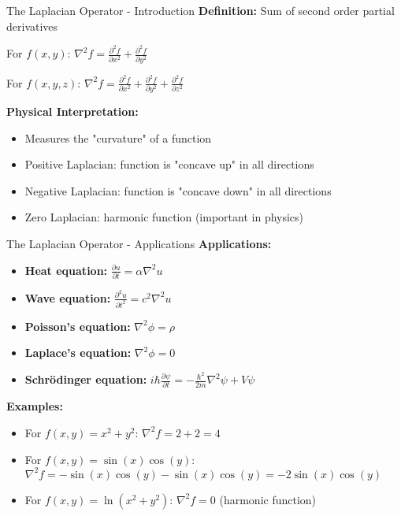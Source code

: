 \documentclass[aspectratio=169]{beamer}
\begin{document}
\begin{frame}{The Laplacian Operator - Introduction}
\textbf{Definition:} Sum of second order partial derivatives

For $f(x,y)$: $\nabla^2 f = \frac{\partial^2 f}{\partial x^2} + \frac{\partial^2 f}{\partial y^2}$

For $f(x,y,z)$: $\nabla^2 f = \frac{\partial^2 f}{\partial x^2} + \frac{\partial^2 f}{\partial y^2} + \frac{\partial^2 f}{\partial z^2}$

\textbf{Physical Interpretation:}
\begin{itemize}
    \item Measures the "curvature" of a function
    \item Positive Laplacian: function is "concave up" in all directions
    \item Negative Laplacian: function is "concave down" in all directions
    \item Zero Laplacian: harmonic function (important in physics)
\end{itemize}
\end{frame}

\begin{frame}{The Laplacian Operator - Applications}
\textbf{Applications:}
\begin{itemize}
    \item \textbf{Heat equation:} $\frac{\partial u}{\partial t} = \alpha \nabla^2 u$
    \item \textbf{Wave equation:} $\frac{\partial^2 u}{\partial t^2} = c^2 \nabla^2 u$
    \item \textbf{Poisson's equation:} $\nabla^2 \phi = \rho$
    \item \textbf{Laplace's equation:} $\nabla^2 \phi = 0$
    \item \textbf{Schrödinger equation:} $i\hbar\frac{\partial \psi}{\partial t} = -\frac{\hbar^2}{2m}\nabla^2 \psi + V\psi$
\end{itemize}

\textbf{Examples:}
\begin{itemize}
    \item For $f(x,y) = x^2 + y^2$: $\nabla^2 f = 2 + 2 = 4$
    \item For $f(x,y) = \sin(x)\cos(y)$: $\nabla^2 f = -\sin(x)\cos(y) - \sin(x)\cos(y) = -2\sin(x)\cos(y)$
    \item For $f(x,y) = \ln(x^2 + y^2)$: $\nabla^2 f = 0$ (harmonic function)
\end{itemize}
\end{frame}
\end{document}
